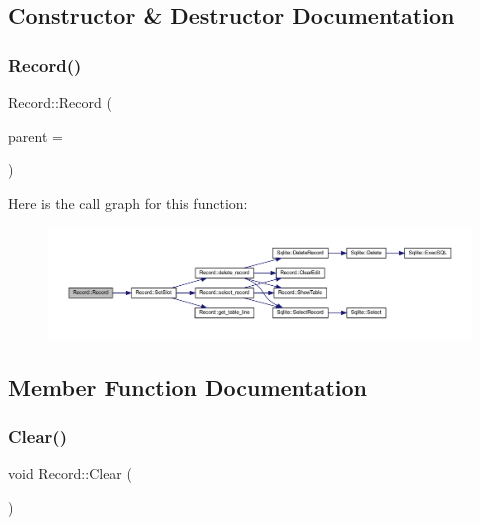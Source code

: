 \subsection{Constructor \& Destructor Documentation}
\mbox{\label{class_record_af85c9f8ff0abca5ee43b4a024557f38a}} 
\subsubsection{\texorpdfstring{Record()}{Record()}}
{\footnotesize\ttfamily Record\+::\+Record (\begin{DoxyParamCaption}\item[{Q\+Widget $\ast$}]{parent = {} }\end{DoxyParamCaption})\hspace{0.3cm}{\ttfamily [explicit]}}

Here is the call graph for this function\+:
\nopagebreak
\begin{figure}[H]
\begin{center}
\leavevmode
\includegraphics[width=350pt]{class_record_af85c9f8ff0abca5ee43b4a024557f38a_cgraph}
\end{center}
\end{figure}


\subsection{Member Function Documentation}
\mbox{\label{class_record_af70466cb248483ed2a32fb5a48a83cac}} 
\subsubsection{\texorpdfstring{Clear()}{Clear()}}
{\footnotesize\ttfamily void Record\+::\+Clear (\begin{DoxyParamCaption}{ }\end{DoxyParamCaption})}

